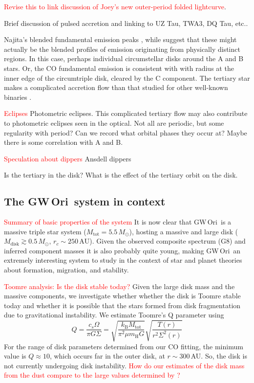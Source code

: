 \documentclass[twocolumn]{aastex61}
\newcommand{\todo}[1]{ \textcolor{red}{#1}}
\newcommand{\gw}{GW\,Ori}
\begin{document}
\todo{Revise this to link discussion of Joey's new outer-period folded lightcurve}.

Brief discussion of pulsed accretion and linking to UZ Tau, TWA3, DQ Tau, etc..

Najita's blended fundamental emission peaks \citep{najita03}, while \citet{bast11} suggest that these might actually be the blended profiles of emission originating from physically distinct regions. In this case, perhaps individual circumstellar disks around the A and B stars. Or, the CO fundamental emission is consistent with with radius at the inner edge of the circumtriple disk, cleared by the C component. The tertiary star makes a complicated accretion flow than that studied for other well-known binaries \citep[e.g., DQ~Tau;]{artymowicz94,mathieu97}.

\todo{Eclipses}
Photometric eclipses. This complicated tertiary flow may also contribute to photometric eclipses seen in the optical. Not all are periodic, but some regularity with period? Can we record what orbital phases they occur at? Maybe there is some correlation with A and B.

\todo{Speculation about dippers}
Ansdell dippers

Is the tertiary in the disk? What is the effect of the tertiary orbit on the disk.


\subsection{The \gw\ system in context}

\todo{Summary of basic properties of the system}
It is now clear that \gw\ is a massive triple star system ($M_\mathrm{tot} = 5.5\,M_\odot$), hosting a massive and large disk ($M_\mathrm{disk} \gtrsim 0.5\,M_\odot$, $r_c \sim 250\,\mathrm{AU}$). Given the observed composite spectrum (G8) and inferred component masses it is also probably quite young, making \gw\ an extremely interesting system to study in the context of star and planet theories about formation, migration, and stability.

\todo{Toomre analysis: Is the disk stable today?}
Given the large disk mass and the massive components, we investigate whether whether the disk is Toomre stable today and whether it is possible that the stars formed from disk fragmentation due to gravitational instability. We estimate Toomre's Q parameter using
\begin{equation}
Q = \frac{c_s \Omega}{\pi G \Sigma} = \sqrt{\frac{k_\mathrm{B} M_\mathrm{tot}}{\pi^2 \mu m_\mathrm{H} G}} \sqrt{\frac{T(r)}{r^2 \Sigma^2(r)}}
\end{equation}
For the range of disk parameters determined from our CO fitting, the minimum value is $Q \approx 10$, which occurs far in the outer disk, at $r \sim 300\,$AU. So, the disk is not currently undergoing disk instability. \todo{How do our estimates of the disk mass from the dust compare to the large values determined by \citet{mathieu91,mathieu95}?}
\end{document}
